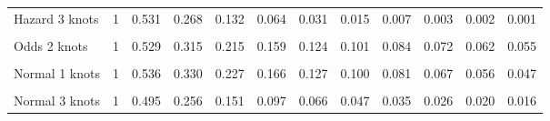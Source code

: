 \documentclass[
]{article}
\begin{document}
\begin{table}[H]
{\begin{tabular}[t]{lrrrrrrrrrrr}
Hazard 3 knots & 1 & 0.531 & 0.268 & 0.132 & 0.064 & 0.031 & 0.015 & 0.007 & 0.003 & 0.002 & 0.001\\
\cellcolor{gray!10}{Odds 1 knots} & \cellcolor{gray!10}{1} & \cellcolor{gray!10}{0.555} & \cellcolor{gray!10}{0.362} & \cellcolor{gray!10}{0.264} & \cellcolor{gray!10}{0.206} & \cellcolor{gray!10}{0.167} & \cellcolor{gray!10}{0.140} & \cellcolor{gray!10}{0.121} & \cellcolor{gray!10}{0.105} & \cellcolor{gray!10}{0.093} & \cellcolor{gray!10}{0.084}\\
Odds 2 knots & 1 & 0.529 & 0.315 & 0.215 & 0.159 & 0.124 & 0.101 & 0.084 & 0.072 & 0.062 & 0.055\\
\cellcolor{gray!10}{Odds 3 knots} & \cellcolor{gray!10}{1} & \cellcolor{gray!10}{0.494} & \cellcolor{gray!10}{0.256} & \cellcolor{gray!10}{0.158} & \cellcolor{gray!10}{0.109} & \cellcolor{gray!10}{0.080} & \cellcolor{gray!10}{0.062} & \cellcolor{gray!10}{0.050} & \cellcolor{gray!10}{0.041} & \cellcolor{gray!10}{0.035} & \cellcolor{gray!10}{0.030}\\
Normal 1 knots & 1 & 0.536 & 0.330 & 0.227 & 0.166 & 0.127 & 0.100 & 0.081 & 0.067 & 0.056 & 0.047\\
\cellcolor{gray!10}{Normal 2 knots} & \cellcolor{gray!10}{1} & \cellcolor{gray!10}{0.534} & \cellcolor{gray!10}{0.327} & \cellcolor{gray!10}{0.223} & \cellcolor{gray!10}{0.163} & \cellcolor{gray!10}{0.124} & \cellcolor{gray!10}{0.098} & \cellcolor{gray!10}{0.079} & \cellcolor{gray!10}{0.065} & \cellcolor{gray!10}{0.054} & \cellcolor{gray!10}{0.046}\\
Normal 3 knots & 1 & 0.495 & 0.256 & 0.151 & 0.097 & 0.066 & 0.047 & 0.035 & 0.026 & 0.020 & 0.016\\
\bottomrule
\end{tabular}}
\end{table}
\end{document}
